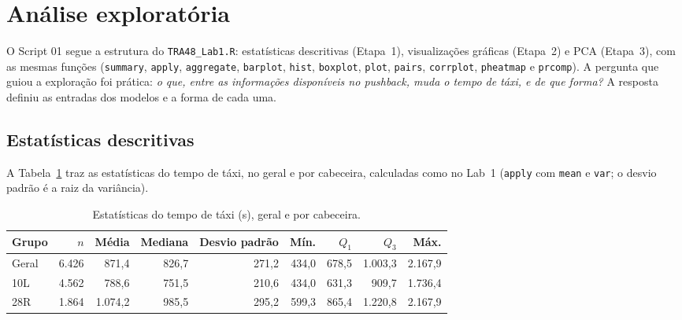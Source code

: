 \documentclass[12pt,a4paper]{article}
\begin{document}
\section{Análise exploratória}\label{sec:exploratoria}

O Script 01 segue a estrutura do \texttt{TRA48\_Lab1.R}: estatísticas descritivas (Etapa~1), visualizações gráficas (Etapa~2) e PCA (Etapa~3), com as mesmas funções (\texttt{summary}, \texttt{apply}, \texttt{aggregate}, \texttt{barplot}, \texttt{hist}, \texttt{boxplot}, \texttt{plot}, \texttt{pairs}, \texttt{corrplot}, \texttt{pheatmap} e \texttt{prcomp}). A pergunta que guiou a exploração foi prática: \textit{o que, entre as informações disponíveis no pushback, muda o tempo de táxi, e de que forma?} A resposta definiu as entradas dos modelos e a forma de cada uma.

\subsection{Estatísticas descritivas}\label{sec:descritiva}

A Tabela~\ref{tab:descritiva} traz as estatísticas do tempo de táxi, no geral e por cabeceira, calculadas como no Lab~1 (\texttt{apply} com \texttt{mean} e \texttt{var}; o desvio padrão é a raiz da variância).

\begin{table}[H]\centering\small
\caption{Estatísticas do tempo de táxi (s), geral e por cabeceira.}\label{tab:descritiva}
\begin{tabular}{lrrrrrrrr}
\toprule
Grupo & $n$ & Média & Mediana & Desvio padrão & Mín. & $Q_1$ & $Q_3$ & Máx.\\
\midrule
Geral & 6.426 & 871,4 & 826,7 & 271,2 & 434,0 & 678,5 & 1.003,3 & 2.167,9\\
10L & 4.562 & 788,6 & 751,5 & 210,6 & 434,0 & 631,3 & 909,7 & 1.736,4\\
28R & 1.864 & 1.074,2 & 985,5 & 295,2 & 599,3 & 865,4 & 1.220,8 & 2.167,9\\
\bottomrule
\end{tabular}
\end{table}
\end{document}

